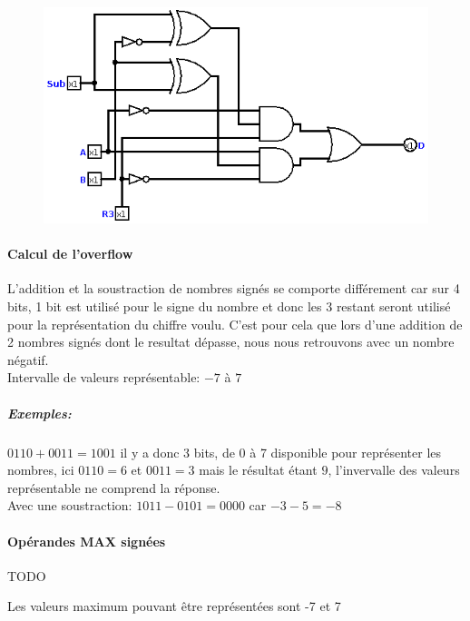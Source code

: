 \documentclass[a4paper]{article}
\begin{document}
\begin{tcolorbox}[colframe=Monokaimagenta,colback=white]

\begin{figure}[H]
    \centering
    \includegraphics[width=\textwidth]{src/OVERFADDSUB_4BITS}
    \label{fig:OVERFADDSUB_4BITS}
\end{figure}

\paragraph{Calcul de l'overflow}
    L'addition et la soustraction de nombres signés se comporte différement car sur 4 bits, 1 bit est utilisé pour le signe du nombre et donc les 3 restant seront utilisé pour la représentation du chiffre voulu. C'est pour cela que lors d'une addition de 2 nombres signés dont le resultat dépasse, nous nous retrouvons avec un nombre négatif.\\
    Intervalle de valeurs représentable: $-7$ à $7$
    \subparagraph{Exemples:} $0110 + 0011 = 1001$ il y a donc 3 bits, de 0 à 7  disponible pour représenter les nombres, ici $0110 = 6$ et $0011 = 3$ mais le résultat étant $9$, l'invervalle des valeurs représentable ne comprend la réponse.\\
    Avec une soustraction: $1011 - 0101  = 0000$ car $-3 - 5 = -8$\\
    
    
\paragraph{Opérandes MAX signées} TODO

Les valeurs maximum pouvant être représentées sont -7 et 7
    \begin{tabular}{|c|c|c|}
   
    
\end{tabular}        
        
\end{tcolorbox}
\end{document}
